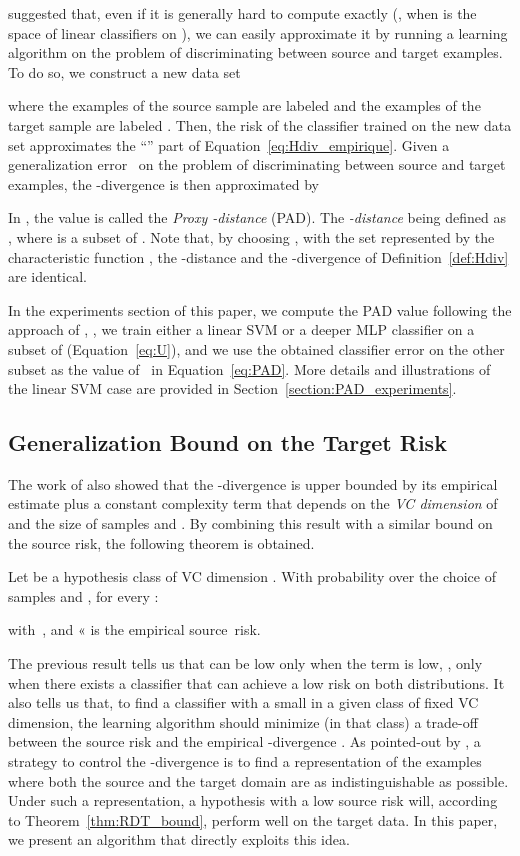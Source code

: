 \documentclass[twoside,11pt]{article}
\begin{document}
\citet{BenDavid-NIPS06} suggested that, even if it is generally hard to compute  exactly (\eg, when  is the space of linear classifiers on ), we can easily approximate it by running a learning algorithm on the problem of discriminating between source and target examples. To do so, we construct a new data set

where the examples of the source sample are labeled  and the examples of the target sample are labeled . Then, the risk of the classifier trained on the new data set  approximates the ``'' part of Equation~\eqref{eq:Hdiv_empirique}. 
Given a generalization error~ on the problem of discriminating between source and target examples, the -divergence is then approximated by

In \citet{BenDavid-NIPS06}, the value  is called the \emph{Proxy -distance} (PAD). The \emph{-distance}
being defined as 
,
where  is a subset of . Note that, by choosing , with  the set represented by the characteristic function , the -distance and the -divergence of Definition~\ref{def:Hdiv} are identical.

In the experiments section of this paper, we compute the PAD value following the approach of \citet{Glorot11,Chen12}, \ie, we train either a linear SVM or a deeper MLP classifier on a subset of  (Equation~\ref{eq:U}), and we use the obtained classifier error on the other subset as the value of~ in Equation~\eqref{eq:PAD}. 
More details and illustrations of the linear SVM case are provided in Section~\ref{section:PAD_experiments}.

\subsection{Generalization Bound on the Target Risk}
The work of \citet{BenDavid-NIPS06,BenDavid-MLJ2010} also showed that the -divergence  is upper bounded by its empirical estimate  plus a constant complexity term that depends on the \emph{VC dimension} of  and the size of samples  and . By combining this result with a similar bound on the source risk, the following theorem is obtained.
\begin{theorem} 
\label{thm:RDT_bound}
Let  be a hypothesis class of VC dimension .
With probability  over the choice of samples  and , for every :

with \,, 
and 
«
is the {empirical source~risk}.
\end{theorem}
The previous result tells us that  can be low only when the  term is low, \ie, only when there exists a classifier that can achieve a low risk on both distributions. It also tells us that, to find a classifier with a small  in a given class of fixed VC dimension, the learning algorithm should minimize (in that class) a trade-off between the source risk  and the empirical -divergence .  
As pointed-out by \citet{BenDavid-NIPS06}, a strategy to control the -divergence is to find a representation of the examples where both the source and the target domain are as indistinguishable as possible. Under such a representation, a hypothesis with a low source risk will, according to Theorem~\ref{thm:RDT_bound}, perform well on the target data.  
In this paper, we present an algorithm that directly exploits this idea.
\end{document}
